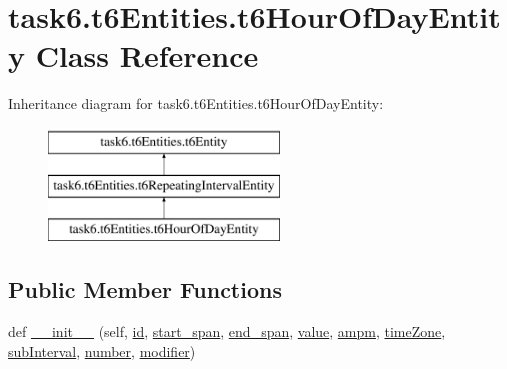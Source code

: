 \hypertarget{classtask6_1_1t6Entities_1_1t6HourOfDayEntity}{}\section{task6.\+t6\+Entities.\+t6\+Hour\+Of\+Day\+Entity Class Reference}
\label{classtask6_1_1t6Entities_1_1t6HourOfDayEntity}
Inheritance diagram for task6.\+t6\+Entities.\+t6\+Hour\+Of\+Day\+Entity\+:\begin{figure}[H]
\begin{center}
\leavevmode
\includegraphics[height=3.000000cm]{classtask6_1_1t6Entities_1_1t6HourOfDayEntity}
\end{center}
\end{figure}
\subsection*{Public Member Functions}
\begin{DoxyCompactItemize}
\item 
def \hyperlink{classtask6_1_1t6Entities_1_1t6HourOfDayEntity_a9c28f38d34c703c758eafaae1fc14845}{\+\_\+\+\_\+init\+\_\+\+\_\+} (self, \hyperlink{classtask6_1_1t6Entities_1_1t6Entity_a96b2e7fb553c920ab2db6f6deb31e3b4}{id}, \hyperlink{classtask6_1_1t6Entities_1_1t6Entity_a8221c36d2995a24200cdfbd74cc9233c}{start\+\_\+span}, \hyperlink{classtask6_1_1t6Entities_1_1t6Entity_a597d42bb02fc9f42277098f0ce21917c}{end\+\_\+span}, \hyperlink{classtask6_1_1t6Entities_1_1t6HourOfDayEntity_af6e1bc0cd2063078c4908597b2832ae7}{value}, \hyperlink{classtask6_1_1t6Entities_1_1t6HourOfDayEntity_ad68268df88efcdec76d183c27cfa59e9}{ampm}, \hyperlink{classtask6_1_1t6Entities_1_1t6HourOfDayEntity_a6906b678bc646b94e4db2be21dbbff26}{time\+Zone}, \hyperlink{classtask6_1_1t6Entities_1_1t6HourOfDayEntity_a637145c887196acce3927eca32aeb576}{sub\+Interval}, \hyperlink{classtask6_1_1t6Entities_1_1t6HourOfDayEntity_a7ee6522e71827ca060e8ce642fc25733}{number}, \hyperlink{classtask6_1_1t6Entities_1_1t6HourOfDayEntity_a01b91998f5bf33c7abd6db7f8a5d1c73}{modifier})
\end{DoxyCompactItemize}
